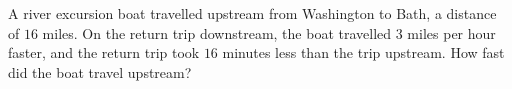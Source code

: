 A river excursion boat travelled upstream from Washington to Bath, a distance of $16$ miles. On the return trip downstream, the boat travelled $3$ miles per hour faster, and the return trip took $16$ minutes less than the trip upstream. How fast did the boat travel upstream?
